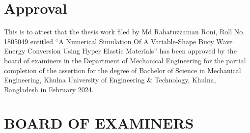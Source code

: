 \section*{\centering\fontsize{14}{16}\selectfont Approval}
\vspace{2\baselineskip}
{\justifying\fontsize{12}{14}\selectfont %
This is to attest that the thesis work filed by Md Rahatuzzaman Roni, Roll No. 1805049 entitled “A Numerical Simulation Of A Variable-Shape Buoy Wave Energy Conversion Using Hyper Elastic Materials” has been approved by the board of examiners in the Department of Mechanical Engineering for the partial completion of the assertion for the degree of Bachelor of Science in Mechanical Engineering, Khulna University of Engineering \& Technology, Khulna, Bangladesh in February 2024.
\par %
}
\vspace{3\baselineskip}
\section*{\centering\fontsize{14}{16}\selectfont BOARD OF EXAMINERS}
\vspace{3\baselineskip}


